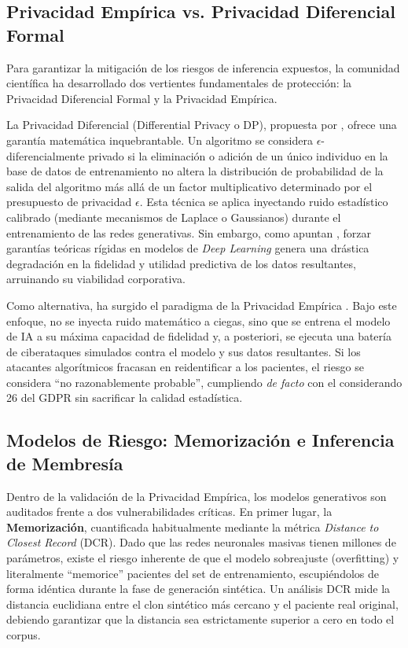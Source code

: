 \subsection{Privacidad Empírica vs. Privacidad Diferencial Formal}

Para garantizar la mitigación de los riesgos de inferencia expuestos, la comunidad científica ha desarrollado dos vertientes fundamentales de protección: la Privacidad Diferencial Formal y la Privacidad Empírica.

La Privacidad Diferencial (Differential Privacy o DP), propuesta por \textcite{dwork2006dp}, ofrece una garantía matemática inquebrantable. Un algoritmo se considera $\epsilon$-diferencialmente privado si la eliminación o adición de un único individuo en la base de datos de entrenamiento no altera la distribución de probabilidad de la salida del algoritmo más allá de un factor multiplicativo determinado por el presupuesto de privacidad $\epsilon$. Esta técnica se aplica inyectando ruido estadístico calibrado (mediante mecanismos de Laplace o Gaussianos) durante el entrenamiento de las redes generativas. Sin embargo, como apuntan \textcite{elemam2020synthetic}, forzar garantías teóricas rígidas en modelos de \textit{Deep Learning} genera una drástica degradación en la fidelidad y utilidad predictiva de los datos resultantes, arruinando su viabilidad corporativa.

Como alternativa, ha surgido el paradigma de la Privacidad Empírica \parencite{stadler2022synthetic}. Bajo este enfoque, no se inyecta ruido matemático a ciegas, sino que se entrena el modelo de IA a su máxima capacidad de fidelidad y, a posteriori, se ejecuta una batería de ciberataques simulados contra el modelo y sus datos resultantes. Si los atacantes algorítmicos fracasan en reidentificar a los pacientes, el riesgo se considera ``no razonablemente probable'', cumpliendo \textit{de facto} con el considerando 26 del GDPR sin sacrificar la calidad estadística.

\subsection{Modelos de Riesgo: Memorización e Inferencia de Membresía}

Dentro de la validación de la Privacidad Empírica, los modelos generativos son auditados frente a dos vulnerabilidades críticas. En primer lugar, la \textbf{Memorización}, cuantificada habitualmente mediante la métrica \textit{Distance to Closest Record} (DCR). Dado que las redes neuronales masivas tienen millones de parámetros, existe el riesgo inherente de que el modelo sobreajuste (overfitting) y literalmente ``memorice'' pacientes del set de entrenamiento, escupiéndolos de forma idéntica durante la fase de generación sintética. Un análisis DCR mide la distancia euclidiana entre el clon sintético más cercano y el paciente real original, debiendo garantizar que la distancia sea estrictamente superior a cero en todo el corpus.

